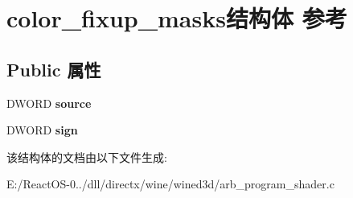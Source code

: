 \hypertarget{structcolor__fixup__masks}{}\section{color\+\_\+fixup\+\_\+masks结构体 参考}
\label{structcolor__fixup__masks}
\subsection*{Public 属性}
\begin{DoxyCompactItemize}
\item 
\mbox{\label{structcolor__fixup__masks_a911916aff4c612ca64f7e8a6324dd00c}} 
D\+W\+O\+RD {\bfseries source}
\item 
\mbox{\label{structcolor__fixup__masks_a2e55ead4a5afc993fdc3f4f91227439f}} 
D\+W\+O\+RD {\bfseries sign}
\end{DoxyCompactItemize}


该结构体的文档由以下文件生成\+:\begin{DoxyCompactItemize}
\item 
E\+:/\+React\+O\+S-\/0../dll/directx/wine/wined3d/arb\+\_\+program\+\_\+shader.\+c\end{DoxyCompactItemize}
